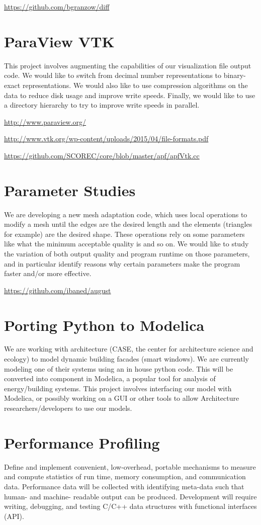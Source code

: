 \documentclass[12pt]{article}
\begin{document}
\url{https://github.com/bgranzow/diff}

\section{ParaView VTK} 
This project involves augmenting the capabilities of our visualization file
output code. We would like to switch from decimal number representations to
binary-exact representations. We would also like to use compression algorithms
on the data to reduce disk usage and improve write speeds. Finally, we would
like to use a directory hierarchy to try to improve write speeds in parallel.

\url{http://www.paraview.org/}

\url{http://www.vtk.org/wp-content/uploads/2015/04/file-formats.pdf}

\url{https://github.com/SCOREC/core/blob/master/apf/apfVtk.cc}

\section{Parameter Studies}
We are developing a new mesh adaptation code, which uses local operations to
modify a mesh until the edges are the desired length and the elements
(triangles for example) are the desired shape. These operations rely on some
parameters like what the minimum acceptable quality is and so on. We would like
to study the variation of both output quality and program runtime on those
parameters, and in particular identify reasons why certain parameters make the
program faster and/or more effective.

\url{https://github.com/ibaned/august}

\section{Porting Python to Modelica} 
We are working with architecture (CASE, the center for architecture science and
ecology) to model dynamic building facades (smart windows). We are currently
modeling one of their systems using an in house python code. This will be
converted into  component in Modelica, a popular tool for analysis of
energy/building systems. This project involves interfacing our model with
Modelica, or possibly working on a GUI or other tools to allow Architecture
researchers/developers to use our models.

\section{Performance Profiling}
Define and implement convenient, low-overhead, portable mechanisms to measure
and compute statistics of run time, memory consumption, and communication data.
Performance data will be collected with identifying meta-data such that human-
and machine- readable output can be produced.  Development will require
writing, debugging, and testing C/C++ data structures with functional
interfaces (API).
\end{document}
